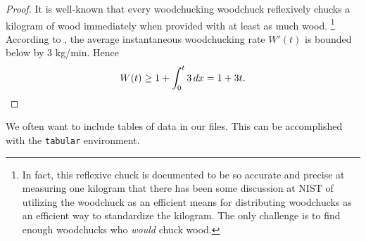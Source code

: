 \documentclass[11pt]{article}
\theoremstyle{definition}
\begin{document}
\begin{proof}
    It is well-known that every woodchucking woodchuck reflexively chucks a kilogram of wood immediately when provided with at least as much wood.
    \footnote{In fact, this reflexive chuck is documented to be so accurate and precise at measuring one kilogram that there has been some discussion at NIST of utilizing the woodchuck as an efficient means for distributing woodchucks as an efficient way to standardize the kilogram.
    The only challenge is to find enough woodchucks who \textit{would} chuck wood.}
    According to \cite{FP11}, the average instantaneous woodchucking rate $W'(t)$ is bounded below by $3$ kg/min.
    Hence
    \[
        W(t) \geq 1 + \int_0^t 3\,dx = 1 + 3t.\qedhere
    \]
\end{proof}

We often want to include tables of data in our files.
This can be accomplished with the \texttt{tabular} environment.
\end{document}
